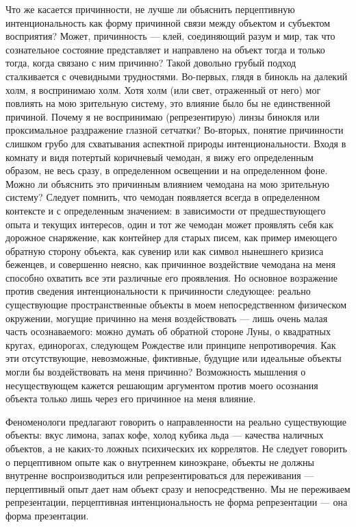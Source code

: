 \documentclass[11pt]{book}
\begin{document}
Что же касается причинности, не лучше ли объяснить перцептивную интенциональность как форму причинной связи между объектом и субъектом восприятия? Может, причинность --- клей, соединяющий разум и мир, так что сознательное состояние представляет и направлено на объект тогда и только тогда, когда связано с ним причинно? Такой довольно грубый подход сталкивается с очевидными трудностями. Во-первых, глядя в бинокль на далекий холм, я воспринимаю холм. Хотя холм (или свет, отраженный от него) мог повлиять на мою зрительную систему, это влияние было бы не единственной причиной. Почему я не воспринимаю (репрезентирую) линзы бинокля или проксимальное раздражение глазной сетчатки? Во-вторых, понятие причинности слишком грубо для схватывания аспектной природы интенциональности. Входя в комнату и видя потертый коричневый чемодан, я вижу его определенным образом, не весь сразу, в определенном освещении и на определенном фоне. Можно ли объяснить это причинным влиянием чемодана на мою зрительную систему? Следует помнить, что чемодан появляется всегда в определенном контексте и с определенным значением: в зависимости от предшествующего опыта и текущих интересов, один и тот же чемодан может проявлять себя как дорожное снаряжение, как контейнер для старых писем, как пример имеющего обратную сторону объекта, как сувенир или как символ нынешнего кризиса беженцев, и совершенно неясно, как причинное воздействие чемодана на меня способно охватить все эти различные его проявления. Но основное возражение против сведения интенциональности к причинности следующее: реально существующие пространственные объекты в моем непосредственном физическом окружении, могущие причинно на меня воздействовать --- лишь очень малая часть осознаваемого: можно думать об обратной стороне Луны, о квадратных кругах, единорогах, следующем Рождестве или принципе непротиворечия. Как эти отсутствующие, невозможные, фиктивные, будущие или идеальные объекты могли бы воздействовать на меня причинно? Возможность мышления о несуществующем кажется решающим аргументом против моего осознания объекта только лишь через его причинное на меня влияние.

Феноменологи предлагают говорить о направленности на реально существующие объекты: вкус лимона, запах кофе, холод кубика льда --- качества наличных объектов, а не каких-то ложных психических их коррелятов. Не следует говорить о перцептивном опыте как о внутреннем киноэкране, объекты не должны внутренне воспроизводиться или репрезентироваться для переживания --- перцептивный опыт дает нам объект сразу и непосредственно. Мы не переживаем репрезентации, перцептивная интенциональность не форма репрезентации --- она форма презентации.
\end{document}
